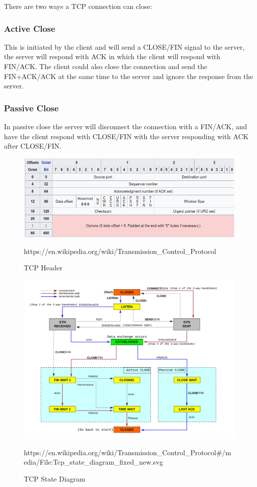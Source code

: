 \documentclass[../CMPUT-404-Notes.tex]{subfiles}
\begin{document}
There are two ways a TCP connection can close:
\subsubsection{Active Close}
This is initiated by the client and will send a CLOSE/FIN signal to the server, the server will respond with ACK in which the client will respond with FIN/ACK.
The client could also close the connection and send the FIN+ACK/ACK at the same time to the server and ignore the response from the server.

\subsubsection{Passive Close}
In passive close the server will disconnect the connection with a FIN/ACK, and have the client respond with CLOSE/FIN with the server responding with ACK after CLOSE/FIN.

\begin{figure}[!h]
  \centering
  \includegraphics[width=\columnwidth]{../assets/TCP-header.png}
  \caption{TCP Header}
  https://en.wikipedia.org/wiki/Transmission\_Control\_Protocol
\end{figure}

\begin{figure}[!h]
  \centering
  \includegraphics[width=\columnwidth]{../assets/Tcp-state-diagram-fixed-new.png}
  \caption{TCP State Diagram}
  https://en.wikipedia.org/wiki/Transmission\_Control\_Protocol\#/media/File:Tcp\_state\_diagram\_fixed\_new.svg
\end{figure}
\end{document}
